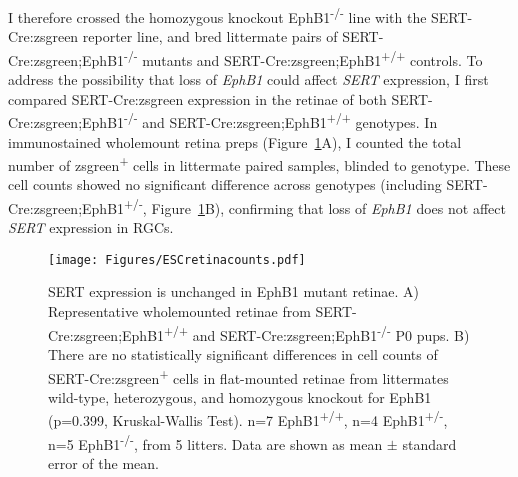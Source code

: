 I therefore crossed the homozygous knockout EphB1\textsuperscript{-/-} line with the SERT-Cre:zsgreen reporter line, and bred littermate pairs of SERT-Cre:zsgreen;EphB1\textsuperscript{-/-} mutants and SERT-Cre:zsgreen;EphB1\textsuperscript{+/+} controls.
To address the possibility that loss of \emph{EphB1} could affect \emph{SERT} expression, I first compared SERT-Cre:zsgreen expression in the retinae of both SERT-Cre:zsgreen;EphB1\textsuperscript{-/-} and SERT-Cre:zsgreen;EphB1\textsuperscript{+/+} genotypes.
In immunostained wholemount retina preps (Figure~\ref{ESCretinacounts}A), I counted the total number of zsgreen\textsuperscript{+} cells in littermate paired samples, blinded to genotype.
These cell counts showed no significant difference across genotypes (including SERT-Cre:zsgreen;EphB1\textsuperscript{+/-}, Figure~\ref{ESCretinacounts}B), confirming that loss of \emph{EphB1} does not affect \emph{SERT} expression in RGCs.
\begin{figure}[hbtp]
    \begin{center}
        \texttt{[image: Figures/ESCretinacounts.pdf]}
        \caption[SERT expression is unchanged in EphB1 mutant retinae.]
        {SERT expression is unchanged in EphB1 mutant retinae.
        A) Representative wholemounted retinae from SERT-Cre:zsgreen;EphB1\textsuperscript{+/+} and SERT-Cre:zsgreen;EphB1\textsuperscript{-/-} P0 pups. 
		B) There are no statistically significant differences in cell counts of SERT-Cre:zsgreen\textsuperscript{+} cells in flat-mounted retinae from littermates wild-type, heterozygous, and homozygous knockout for EphB1 (p=0.399, Kruskal-Wallis Test).
        n=7 EphB1\textsuperscript{+/+}, n=4 EphB1\textsuperscript{+/-}, n=5 EphB1\textsuperscript{-/-}, from 5 litters.
        Data are shown as mean $\pm$ standard error of the mean.
        }
        \label{ESCretinacounts}
    \end{center}
\end{figure}

